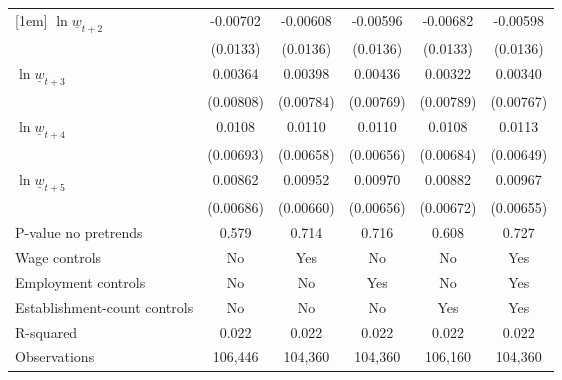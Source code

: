 {\begin{tabular}{l*{5}{c}}
[1em]
$\ln \underline{w}_{t+2}$& -0.00702         & -0.00608         & -0.00596         & -0.00682         & -0.00598         \\
          & (0.0133)         & (0.0136)         & (0.0136)         & (0.0133)         & (0.0136)         \\
[1em]
$\ln \underline{w}_{t+3}$&  0.00364         &  0.00398         &  0.00436         &  0.00322         &  0.00340         \\
          &(0.00808)         &(0.00784)         &(0.00769)         &(0.00789)         &(0.00767)         \\
[1em]
$\ln \underline{w}_{t+4}$&   0.0108         &   0.0110         &   0.0110\sym{*}  &   0.0108         &   0.0113\sym{*}  \\
          &(0.00693)         &(0.00658)         &(0.00656)         &(0.00684)         &(0.00649)         \\
[1em]
$\ln \underline{w}_{t+5}$&  0.00862         &  0.00952         &  0.00970         &  0.00882         &  0.00967         \\
          &(0.00686)         &(0.00660)         &(0.00656)         &(0.00672)         &(0.00655)         \\
\hline
P-value no pretrends&    0.579         &    0.714         &    0.716         &    0.608         &    0.727         \\
Wage controls&       No         &      Yes         &       No         &       No         &      Yes         \\
Employment controls&       No         &       No         &      Yes         &       No         &      Yes         \\
Establishment-count controls&       No         &       No         &       No         &      Yes         &      Yes         \\
R-squared &    0.022         &    0.022         &    0.022         &    0.022         &    0.022         \\
Observations&  106,446         &  104,360         &  104,360         &  106,160         &  104,360         \\
\hline\hline
\end{tabular}
}
